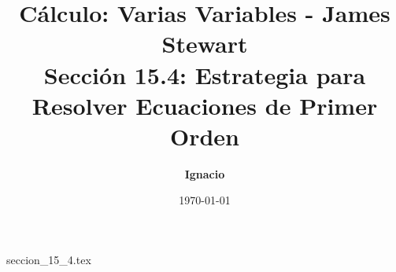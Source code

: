 \documentclass[11pt,spanish,oneside]{report}
\title{\textbf{Cálculo: Varias Variables - James Stewart} \\ \Large Sección 15.4: Estrategia para Resolver Ecuaciones de Primer Orden}
\author{\textbf{Ignacio}}
\date{\today}
\begin{document}
\maketitle

{seccion_15_4.tex}
\end{document}
